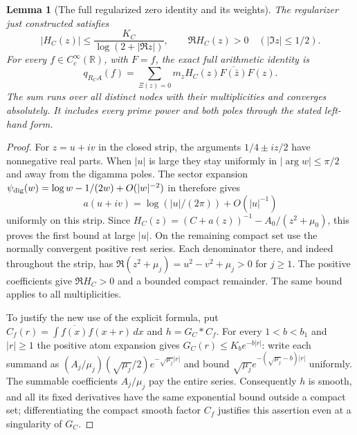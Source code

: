 \documentclass[11pt]{article}
\newtheorem{lemma}[theorem]{Lemma}
\theoremstyle{remark}\newtheorem{remark}[theorem]{Remark}
\newcommand{\R}{\mathbb R}
\begin{document}
\begin{lemma}[The full regularized zero identity and its weights]
\label{lem:rest-zero-identity}
The regularizer just constructed satisfies
\[
 |H_C(z)|\le\frac{K_C}{\log(2+|\Re z|)},\qquad
 \Re H_C(z)>0\quad (|\Im z|\le1/2).                 \tag{RGS1}
\]
For every $f\in C_c^\infty(\R)$, with $F=\widehat f$, the exact
full arithmetic identity is
\[
 q_{R_CA}(f)=\sum_{\Xi(z)=0}m_z H_C(z)
                         \overline{F(\bar z)}F(z). \tag{RGS2}
\]
The sum runs over all distinct nodes with their multiplicities
and converges absolutely. It includes every prime power and
both poles through the stated left-hand form.
\end{lemma}
\begin{proof}
For $z=u+iv$ in the closed strip, the arguments
$1/4\pm iz/2$ have nonnegative real parts. When $|u|$ is large
they stay uniformly in $|\arg w|\le\pi/2$ and away from the
digamma poles. The sector expansion
$\psi_{\rm dig}(w)=\log w-1/(2w)+O(|w|^{-2})$
in \cite[5.11.2 and Section 5.11(ii)]{DLMFGamma} therefore gives
\[
 a(u+iv)=\log(|u|/(2\pi))+O(|u|^{-1})
\]
uniformly on this strip. Since
$H_C(z)=(C+a(z))^{-1}-A_0/(z^2+\mu_0)$, this proves the
first bound at large $|u|$. On the remaining compact set use
the normally convergent positive rest series.
Each denominator there, and indeed throughout the strip, has
$\Re(z^2+\mu_j)=u^2-v^2+\mu_j>0$ for $j\ge1$.
The positive coefficients give $\Re H_C>0$ and a bounded
compact remainder. The same bound applies to all multiplicities.

To justify the new use of the explicit formula, put
$C_f(r)=\int\overline{f(x)}f(x+r)\,dx$ and $h=G_C*C_f$.
For every $1<b<b_1$ and $|r|\ge1$ the positive atom expansion gives
$G_C(r)\le K_b e^{-b|r|}$: write each summand as
$(A_j/\mu_j)(\sqrt{\mu_j}/2)e^{-\sqrt{\mu_j}|r|}$
and bound $\sqrt{\mu_j}e^{-(\sqrt{\mu_j}-b)|r|}$ uniformly.
The summable coefficients $A_j/\mu_j$ pay the entire series.
Consequently $h$ is smooth, and all its fixed derivatives have
the same exponential bound outside a compact set; differentiating
the compact smooth factor $C_f$ justifies this assertion even
at a singularity of $G_C$.


\end{proof}
\end{document}
